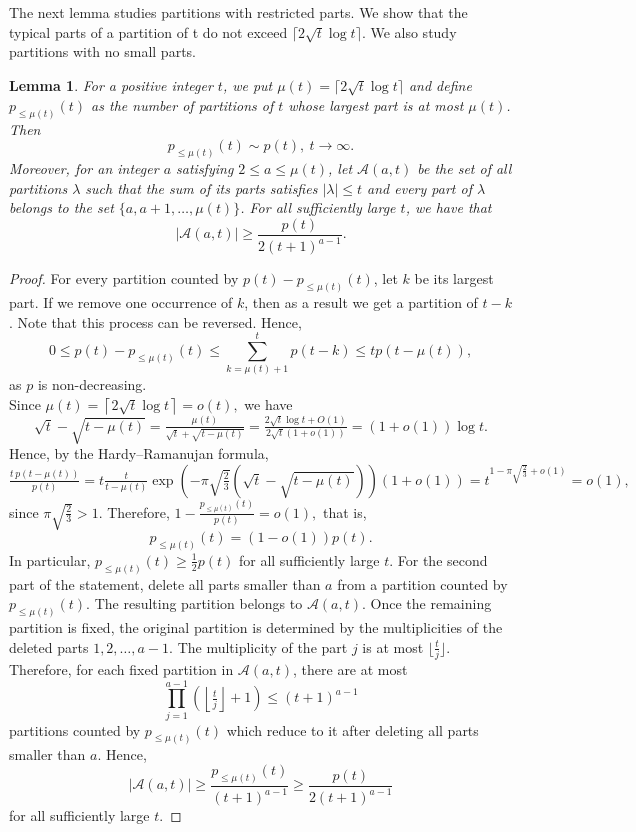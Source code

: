 \documentclass[12pt,a4paper]{amsart}
\numberwithin{equation}{section}
\theoremstyle{plain}
\newtheorem{lm}[thm]{Lemma}
\theoremstyle{definition}
\theoremstyle{remark}
\begin{document}
The next lemma studies partitions with restricted parts. We show that the typical parts of a partition of t do not exceed $\lceil 2\sqrt{t}\log t\rceil$. We also study partitions with no small parts.
\begin{lm}\label{lm: restricted partitions}
For a positive integer $t$, we put $\mu(t)=\lceil2\sqrt t\log t\rceil$ and define $p_{\le  \mu(t)}(t)$ as the number of partitions of $t$ whose largest part is at most $\mu(t)$. Then $$p_{\le  \mu(t)}(t)\sim p(t),\ t\to\infty.$$
Moreover, for an integer $a$ satisfying $2\le  a\le  \mu(t)$, let $\mathcal A(a,t)$ be the set of all partitions $\lambda$ such that
the sum of its parts satisfies $|\lambda|\le  t$ and every part of $\lambda$ belongs to the set $\{a,a+1,\ldots,\mu(t)\}$. For all sufficiently large $t$, we have that
$$
|\mathcal A(a,t)|
\geq
\frac{p(t)}{2(t+1)^{a-1}}.
$$
\end{lm}
\begin{proof}
For every partition counted by $p(t)-p_{\le \mu(t)}(t)$, let $k$ be its largest part. If we remove one occurrence of $k$, then as a result we get a partition of $t-k$. Note that this process can be reversed. Hence, $$0\le p(t)-p_{\le  \mu(t)}(t)\le\sum_{k=\mu(t)+1}^{t}p(t-k)\le  t p(t-\mu(t)),$$
as $p$ is non-decreasing.\\
Since
$
\mu(t)=\left\lceil2\sqrt t\log t\right\rceil=o(t),
$
we have
$$
\sqrt t-\sqrt{t-\mu(t)}
=
\tfrac{\mu(t)}{\sqrt t+\sqrt{t-\mu(t)}}
=
\tfrac{2\sqrt t\log t+O(1)}
{2\sqrt t(1+o(1))}
=
(1+o(1))\log t.
$$
Hence, by the Hardy--Ramanujan formula,
$$
\tfrac{t\,p(t-\mu(t))}{p(t)}
=t\tfrac{t}{t-\mu(t)}
\exp\left(-\pi\sqrt{\tfrac{2}{3}}\left(\sqrt t-\sqrt{t-\mu(t)}\right)\right)(1+o(1))=
t^{1-\pi\sqrt{\tfrac23}+o(1)}
=
o(1),
$$
since
$
\pi\sqrt{\tfrac23}>1.
$
Therefore,
$
1-\frac{p_{\le\mu(t)}(t)}{p(t)}
=o(1),
$
that is,
$$
p_{\le\mu(t)}(t)
=(1-o(1))p(t).
$$
In particular,
$
p_{\le\mu(t)}(t)\ge\frac12p(t)
$
for all sufficiently large $t$.
For the second part of the statement, delete all parts smaller than $a$ from a partition counted by $p_{\le  \mu(t)}(t)$. The resulting partition belongs to $\mathcal A(a,t)$. 
Once the remaining partition is fixed, the original partition is determined by the multiplicities of the deleted parts $1,2,\ldots,a-1$. The multiplicity of the part $j$ is at most $\lfloor \tfrac{t}{j}\rfloor$. 
Therefore, for each fixed partition in $\mathcal A(a,t)$, there are at most
$$
\prod_{j=1}^{a-1}\left(\left\lfloor\tfrac{t}{j}\right\rfloor+1\right)
\le 
(t+1)^{a-1}
$$
partitions counted by $p_{\le  \mu(t)}(t)$ which reduce to it after deleting all parts smaller than $a$. Hence,
$$
|\mathcal A(a,t)|
\geq
\frac{p_{\le  \mu(t)}(t)}{(t+1)^{a-1}}
\geq
\frac{p(t)}{2(t+1)^{a-1}}
$$
for all sufficiently large $t$.
\end{proof}
\end{document}
